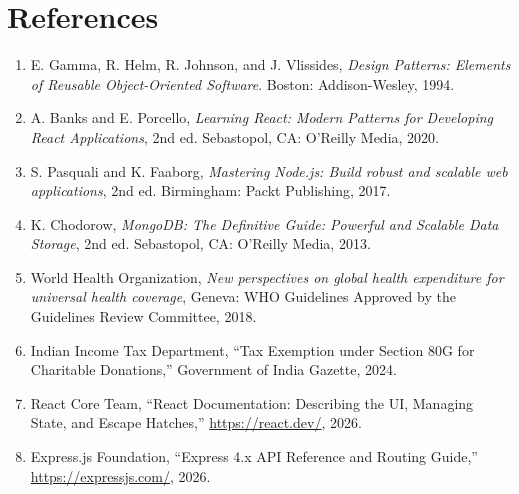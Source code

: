 \documentclass[12pt,a4paper,oneside]{report}
\begin{document}
\chapter{References}
\begin{enumerate}
    \item E. Gamma, R. Helm, R. Johnson, and J. Vlissides, \textit{Design Patterns: Elements of Reusable Object-Oriented Software}. Boston: Addison-Wesley, 1994.
    \item A. Banks and E. Porcello, \textit{Learning React: Modern Patterns for Developing React Applications}, 2nd ed. Sebastopol, CA: O'Reilly Media, 2020.
    \item S. Pasquali and K. Faaborg, \textit{Mastering Node.js: Build robust and scalable web applications}, 2nd ed. Birmingham: Packt Publishing, 2017.
    \item K. Chodorow, \textit{MongoDB: The Definitive Guide: Powerful and Scalable Data Storage}, 2nd ed. Sebastopol, CA: O'Reilly Media, 2013.
    \item World Health Organization, \textit{New perspectives on global health expenditure for universal health coverage}, Geneva: WHO Guidelines Approved by the Guidelines Review Committee, 2018.
    \item Indian Income Tax Department, ``Tax Exemption under Section 80G for Charitable Donations,'' Government of India Gazette, 2024.
    \item React Core Team, ``React Documentation: Describing the UI, Managing State, and Escape Hatches,'' \url{https://react.dev/}, 2026.
    \item Express.js Foundation, ``Express 4.x API Reference and Routing Guide,'' \url{https://expressjs.com/}, 2026.
\end{enumerate}
\end{document}
